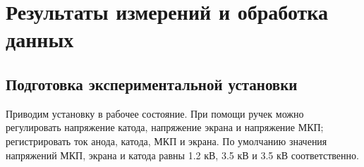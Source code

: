 \section* {Результаты измерений и обработка данных}

\subsection* {Подготовка экспериментальной установки}
Приводим установку в рабочее состояние. При помощи ручек можно регулировать напряжение катода, напряжение экрана и напряжение МКП; регистрировать ток анода, катода, МКП и экрана. По умолчанию значения напряжений МКП, экрана и катода равны 1.2 кВ, 3.5 кВ и 3.5 кВ соответственно.




